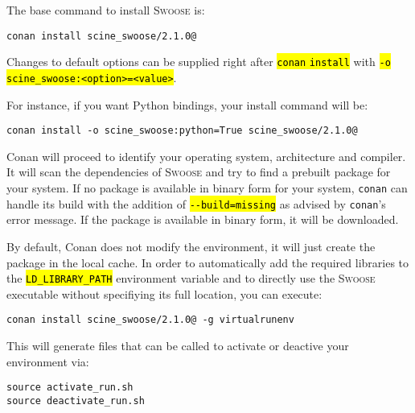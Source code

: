 \documentclass[]{tufte-book}
\begin{document}
The base command to install \textsc{Swoose} is:

\begin{mdframed}[backgroundcolor=LightSteelBlue!25, linewidth=0pt]
\begin{verbatim}
conan install scine_swoose/2.1.0@
\end{verbatim}
\end{mdframed}

Changes to default options can be supplied right after \hl{\:\texttt{conan} \texttt{install}\:} with \hl{\:\texttt{-o} \texttt{scine\_swoose:<option>=<value>}\:}.

For instance, if you want Python bindings, your install command will be:

\begin{mdframed}[backgroundcolor=LightSteelBlue!25, userdefinedwidth=12cm, linewidth=0pt]
\begin{verbatim}
conan install -o scine_swoose:python=True scine_swoose/2.1.0@
\end{verbatim}
\end{mdframed}

Conan will proceed to identify your operating system, architecture and compiler.
It will scan the dependencies of \textsc{Swoose} and try to find a prebuilt
package for your system. If no package is available in binary form for your
system, \texttt{conan} can handle its build with the addition of
\hl{\:\texttt{-{}-build=missing}\:} as advised by \texttt{conan}'s error message. If the package is
available in binary form, it will be downloaded.

By default, Conan does not modify the environment, it will just create the package in the local cache.
In order to automatically add the required libraries to the \hl{\:\texttt{LD\_LIBRARY\_PATH}\:} environment variable and to directly use the \textsc{Swoose} executable without specifiying its full location, you can execute:

\begin{mdframed}[backgroundcolor=LightSteelBlue!25, linewidth=0pt]
\begin{verbatim}
conan install scine_swoose/2.1.0@ -g virtualrunenv
\end{verbatim}
\end{mdframed}

This will generate files that can be called to activate or deactive your environment via:
\begin{mdframed}[backgroundcolor=LightSteelBlue!25, linewidth=0pt]
\begin{verbatim}
source activate_run.sh
source deactivate_run.sh
\end{verbatim}
\end{mdframed}
\end{document}
